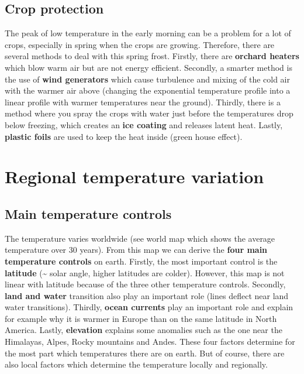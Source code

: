 \documentclass[oneside]{book}
\begin{document}
\subsection{Crop protection}\label{crop-protection}

The peak of low temperature in the early morning can be a problem for a
lot of crops, especially in spring when the crops are growing.
Therefore, there are several methods to deal with this spring frost.
Firstly, there are \textbf{orchard heaters} which blow warm air but are
not energy efficient. Secondly, a smarter method is the use of
\textbf{wind generators} which cause turbulence and mixing of the cold
air with the warmer air above (changing the exponential temperature
profile into a linear profile with warmer temperatures near the ground).
Thirdly, there is a method where you spray the crops with water just
before the temperatures drop below freezing, which creates an
\textbf{ice coating} and releases latent heat. Lastly, \textbf{plastic
foils} are used to keep the heat inside (green house effect).

\section{Regional temperature
variation}\label{regional-temperature-variation}

\subsection{Main temperature controls}\label{main-temperature-controls}

The temperature varies worldwide (see world map which shows the average
temperature over 30 years). From this map we can derive the \textbf{four
main temperature controls} on earth. Firstly, the most important control
is the \textbf{latitude} (\textasciitilde{} solar angle, higher
latitudes are colder). However, this map is not linear with latitude
because of the three other temperature controls. Secondly, \textbf{land
and water} transition also play an important role (lines deflect near
land water transitions). Thirdly, \textbf{ocean currents} play an
important role and explain for example why it is warmer in Europe than
on the same latitude in North America. Lastly, \textbf{elevation}
explains some anomalies such as the one near the Himalayas, Alpes, Rocky
mountains and Andes. These four factors determine for the most part
which temperatures there are on earth. But of course, there are also
local factors which determine the temperature locally and regionally.
\end{document}
